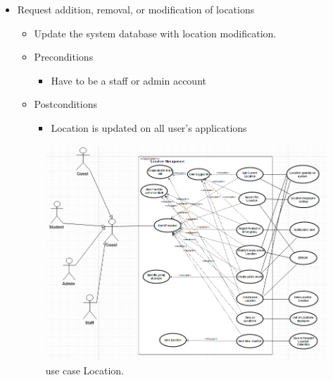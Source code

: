 \documentclass[12pt]{article}
\begin{document}
\begin{enumerate}
\begin{itemize}
				\item Request addition, removal, or modification of locations
				\begin{itemize}
					\item Update the system database with location modification. 
					\item Preconditions
					\begin{itemize}
						\item Have to be a staff or admin account
					\end{itemize}
					\item Postconditions
					\begin{itemize}
						\item Location is updated on all user’s applications
					\end{itemize}
				\end{itemize}
				\begin{figure}
                     \includegraphics[width=\linewidth]{useCaseLocation.png}
                     \caption{use case Location.}
  \label{fig:location1}
			    \end{figure}
			\end{itemize}
			

\end{enumerate}
\end{document}
